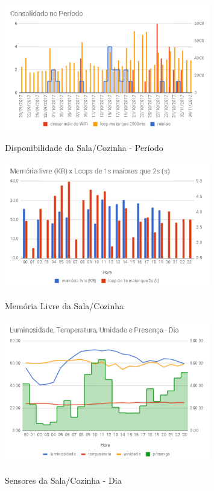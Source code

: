 \begin{figure}[H]
	\centering
	\caption{Disponibilidade da Sala/Cozinha - Período}
	\includegraphics[width=0.8\textwidth]{salacozinhadispperiodo}
	\label{fig:salacozinhadispperiodo}
\end{figure}

\begin{figure}[H]
	\centering
	\caption{Memória Livre da Sala/Cozinha}
	\includegraphics[width=0.8\textwidth]{memlivresalacozinha}
	\label{fig:memlivresalacozinha}
\end{figure}

\begin{figure}[H]
	\centering
	\caption{Sensores da Sala/Cozinha - Dia}
	\includegraphics[width=0.8\textwidth]{sensoresdiasalacozinha}
	\label{fig:sensoresdiasalacozinha}
\end{figure}


